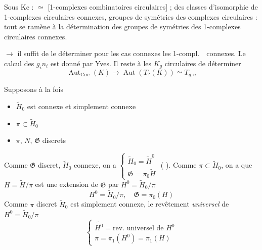\documentclass[11pt,a4paper]{article}
\begin{document}
Sous $\mathrm{Kc}$ :
$\simeq$ [1-complexes combinatoires circulaires] ;
 des classes d'isomorphie de 1-complexes circulaires
connexes, groupes de symétries des complexes circulaires : tout se ramène à
la détermination des groupes de symétries des 1-complexes circulaires
connexes.

$\to$ il suffit de le déterminer pour les \struck{\ill{}} cas connexes
 les 1-compl.\ \ connexes. Le calcul des
$g_i n_i$ est donné par Yves. Il reste à  \ill{} les
$K_g$ circulaires de déterminer
\[
  \boxed{\operatorname{Aut}_{\mathrm{Circ}}(K) \to \operatorname{Aut}(T_{?}(K)) \simeq T_{g,n}}
\]



Supposons à la fois
\begin{itemize}
  \item[$\alpha$)] $\widetilde{H}_0$ est connexe et simplement connexe
  \item[$\beta$)] $\pi \subset \widetilde{H}_0$
  \item[$\gamma$)] $\pi$, $N$, $\mathfrak{G}$ discrets
\end{itemize}

Comme $\mathfrak{G}$ discret, $\widetilde{H}_0$ connexe, on a
$\left\{ \begin{array}{l}
  \widetilde{H}_0 = \widetilde{H}^0 \\
  \mathfrak{G} = \pi_0 \widetilde{H}
\end{array} \right.$ ( ).
Comme $\pi \subset \widetilde{H}_0$, on a que $H = \widetilde{H}/\pi$ est une
extension de $\mathfrak{G}$ par $H^0 = \widetilde{H}_0/\pi$
\[
  \boxed{H^0 = \widetilde{H}_0/\pi , \quad \mathfrak{G} = \pi_0(H)}
\]
Comme $\pi$ discret\supplied{,} $\widetilde{H}_0$ est simplement connexe,
 le revêtement \emph{universel} de
$H^0 = \widetilde{H}_0/\pi$
\[
  \boxed{\left\{ \begin{array}{l}
    \widetilde{H^0} = \text{rev.\ universel de } H^0 \\
    \pi = \pi_1(H^0) = \pi_1(H)
  \end{array} \right.}
\]
\end{document}
